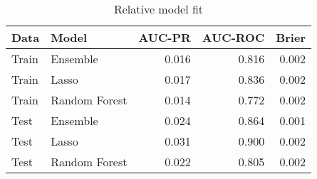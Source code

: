 \begin{table}[ht]
\centering
\begin{tabular}{llrrr}
  \toprule
Data & Model & AUC-PR & AUC-ROC & Brier \\ 
  \midrule
Train & Ensemble & 0.016 & 0.816 & 0.002 \\ 
  Train & Lasso & 0.017 & 0.836 & 0.002 \\ 
  Train & Random Forest & 0.014 & 0.772 & 0.002 \\ 
  Test & Ensemble & 0.024 & 0.864 & 0.001 \\ 
  Test & Lasso & 0.031 & 0.900 & 0.002 \\ 
  Test & Random Forest & 0.022 & 0.805 & 0.002 \\ 
   \bottomrule
\end{tabular}
\caption{Relative model fit} 
\label{tab:fit}
\end{table}
